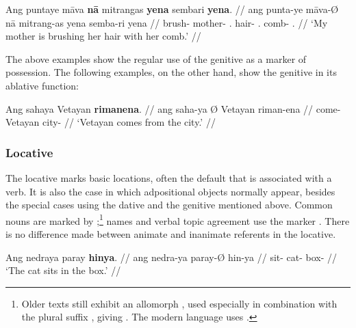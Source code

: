 \ex\begingl
	\gla Ang puntaye māva \textbf{nā} mitrangas \textbf{yena} sembari 
		\textbf{yena}. //
	\glb ang punta-ye māva-Ø nā mitrang-as yena semba-ri 
		yena //
	\glc \AgtT{} brush-\TsgF{} mother-\Top{} \Fsg{}.\Gen{} hair-\Parg{} 
		\TsgF{}.\Gen{} comb-\Ins{} \TsgF{}.\Gen{} //
	\glft `My mother is brushing her hair with her comb.' //
\endgl\xe

The above examples show the regular use of the genitive as a marker of
possession. The following examples, on the other hand, show the genitive in its
ablative function:

\ex\begingl
	\gla Ang sahaya {} Vetayan \textbf{rimanena}. //
	\glb ang saha-ya Ø Vetayan riman-ena //
	\glc \AgtT{} come-\TsgM{} \Top{} Vetayan city-\Gen{} //
	\glft `Vetayan comes from the city.' //
\endgl


\xe


\subsubsection{Locative}

The locative marks basic locations, often the default that is associated with a
verb. It is also the case in which adpositional objects normally appear,
besides the special cases using the dative and the genitive mentioned above.
Common nouns are marked by ;\footnote{Older texts still exhibit
an allomorph , used especially in combination with the plural
suffix , giving . The modern language uses
.} names and verbal topic agreement use the marker 
. There is no difference made between animate and inanimate 
referents in the locative.

\pex\label{ex:locplain}
\a\label{ex:locnedra}\begingl
	\gla Ang nedraya paray \textbf{hinya}. //
	\glb ang nedra-ya paray-Ø hin-ya //
	\glc \AgtT{} sit-\TsgM{} cat-\Top{} box-\Loc{} //
	\glft `The cat sits in the box.' //
\endgl

